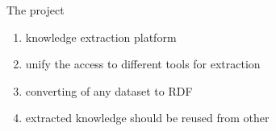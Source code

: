 \begin{frame}{The project}

\begin{enumerate}
		\item knowledge extraction platform
		\item unify the access to different tools for extraction 
		\item converting of any dataset to RDF
		\item extracted knowledge should be reused from other
	\end{enumerate}
\end{frame}